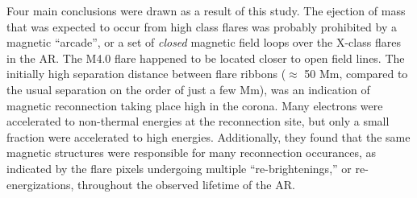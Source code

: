 \documentclass[12pt]{article}
\begin{document}
Four main conclusions were drawn as a result of this study.
The ejection of mass that was expected to occur from high
class flares was probably prohibited by a magnetic ``arcade'',
or a set of \emph{closed} magnetic field loops over the X-class
flares in the AR.
The M4.0 flare happened to be located closer to open field lines.
The initially high separation distance between flare ribbons
($\approx$ 50 Mm, compared to the usual separation on the order of
just a few Mm), was an indication 
of magnetic reconnection taking place high in the corona.
Many electrons were accelerated to non-thermal energies at the
reconnection site,
but only a small fraction were accelerated to high energies.
Additionally, they found that the same magnetic structures were
responsible for many reconnection occurances, as indicated by
the flare pixels undergoing multiple ``re-brightenings,'' or
re-energizations, throughout the observed lifetime of the AR\@.

\newpage

\end{document}
